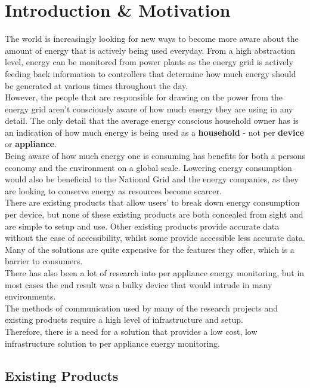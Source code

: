 \documentclass[preprint,12pt,3p]{elsarticle}
\begin{document}
\clearpage
\tableofcontents
\clearpage
\section{Introduction \& Motivation}

The world is increasingly looking for new ways to become more aware about the amount of energy that is actively being used everyday. From a high abstraction level, energy can be monitored from power plants as the energy grid is actively feeding back information to controllers that determine how much energy should be generated at various times throughout the day.\\
However, the people that are responsible for drawing on the power from the energy grid aren't consciously aware of how much energy they are using in any detail. The only detail that the average energy conscious household owner has is an indication of how much energy is being used as a \textbf{household} - not per \textbf{device} or \textbf{appliance}.\\
Being aware of how much energy one is consuming has benefits for both a persons economy and the environment on a global scale. Lowering energy consumption would also be beneficial to the National Grid and the energy companies, as they are looking to conserve energy as resources become scarcer.\\
There are existing products that allow users' to break down energy consumption per device, but none of these existing products are both concealed from sight and are simple to setup and use. Other existing products provide accurate data without the ease of accessibility, whilst some provide accessible less accurate data. Many of the solutions are quite expensive for the features they offer, which is a barrier to consumers.\\
There has also been a lot of research into per appliance energy monitoring, but in most cases the end result was a bulky device that would intrude in many environments.\\
The methods of communication used by many of the research projects and existing products require a high level of infrastructure and setup.\\ 
Therefore, there is a need for a solution that provides a low cost, low infrastructure solution to per appliance energy monitoring.


\subsection{Existing Products}
\end{document}

